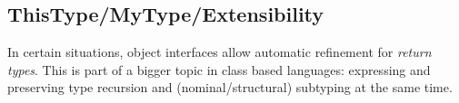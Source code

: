 
% 

\subsection{ThisType/MyType/Extensibility}

In certain situations, object interfaces allow automatic refinement for \emph{return
types}. This is part of a bigger topic in class based languages: expressing and
preserving type recursion and (nominal/structural) subtyping at the same time.

